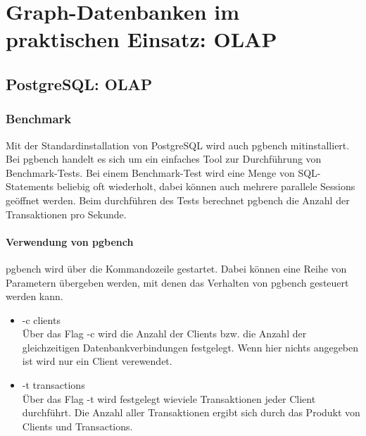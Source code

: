 \chapter{Graph-Datenbanken im praktischen Einsatz: OLAP}
\section{PostgreSQL: OLAP}
\subsection{Benchmark}
Mit der Standardinstallation von PostgreSQL wird auch pgbench mitinstalliert. Bei pgbench handelt es sich um ein einfaches Tool zur Durchführung von Benchmark-Tests. Bei einem Benchmark-Test wird eine Menge von \ac{SQL}-Statements beliebig oft wiederholt, dabei können auch mehrere parallele Sessions geöffnet werden. Beim durchführen des Tests berechnet pgbench die Anzahl der Transaktionen pro Sekunde.
\subsubsection{Verwendung von pgbench}
pgbench wird über die Kommandozeile gestartet. Dabei können eine Reihe von Parametern übergeben werden, mit denen das Verhalten von pgbench gesteuert werden kann.
\begin{itemize}
	\item -c clients  \\
	Über das Flag -c wird die Anzahl der Clients bzw. die Anzahl der gleichzeitigen Datenbankverbindungen festgelegt. Wenn hier nichts angegeben ist wird nur ein Client verewendet.
	\item -t transactions \\
	Über das Flag -t wird festgelegt wieviele Transaktionen jeder Client durchführt. Die Anzahl aller Transaktionen ergibt sich durch das Produkt von Clients und Transactions.
\end{itemize}
